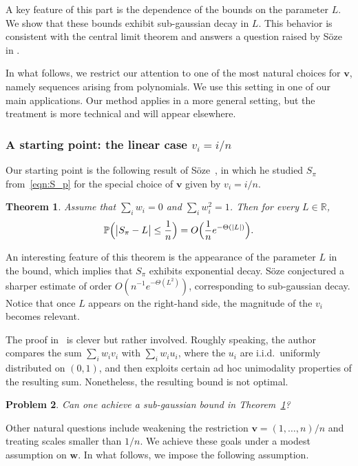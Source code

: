 \documentclass[reqno]{amsart}
\newcommand\R{{\mathbb{R}}}
\renewcommand\P{{\mathbb{P}}}
\newcommand\BMv{{\bm v}}
\newcommand\BMw{{\bm w}}
\theoremstyle{plain}
\newtheorem{theorem}{Theorem}[section]
\newtheorem{problem}[theorem]{Problem}
\theoremstyle{definition}
\begin{document}
A key feature of this part is the dependence of the bounds on the parameter $L$. We show that these bounds exhibit sub-gaussian decay in $L$. This behavior is consistent with the central limit theorem and answers a question raised by S\"oze in \cite{Soze2}.

In what follows, we restrict our attention to one of the most natural choices for $\BMv$, namely
sequences arising from polynomials. We use this setting in one of our main applications. Our method applies in a more general setting, but the treatment is more technical and will appear elsewhere.


\subsubsection{A starting point: the linear case $v_i = i/n$}

Our starting point is the following result of S{\"o}ze~\cite[Lemma~4]{Soze2}, in
which he studied $S_{\pi}$ from~\eqref{eqn:S_p} for the special choice of
$\BMv$ given by $v_i=i/n$.

\begin{theorem}\label{lemma:Koze:0}
Assume that $\sum_i w_i = 0$ and $\sum_i w_i^2 = 1$. Then for every $L\in\R$,
\[
\P\Bigl(\bigl|S_{\pi}-L\bigr|\le \frac{1}{n}\Bigr)
= O\Bigl(\frac{1}{n} e^{-\Theta(|L|)}\Bigr).
\]
\end{theorem}

An interesting feature of this theorem is the appearance of the parameter $L$
in the bound, which implies that $S_{\pi}$ exhibits exponential decay. S{\"o}ze
\cite{Soze2} conjectured a sharper estimate of order
$O(n^{-1} e^{-\Theta(L^{2})})$, corresponding to sub-gaussian
decay. Notice that once $L$ appears on the right-hand side, the magnitude of the $v_{i}$ becomes
relevant.

The proof in~\cite{Soze2} is clever but rather involved. Roughly speaking, the
author compares the sum $\sum_i w_i v_{i}$ with $\sum_i w_i u_i$, where the
$u_i$ are i.i.d.\ uniformly distributed on $(0,1)$, and then exploits certain
ad hoc unimodality properties of the resulting sum. Nonetheless, the resulting
bound is not optimal.

\begin{problem}\label{Problem:Soze}
Can one achieve a sub-gaussian bound in Theorem~\ref{lemma:Koze:0}?
\end{problem}

Other natural questions include weakening the  restriction
$\BMv=(1,\dots,n)/n$ and treating scales smaller than $1/n$. We achieve
these goals under a modest assumption on $\BMw$. In what follows, we impose the following assumption.
\end{document}
